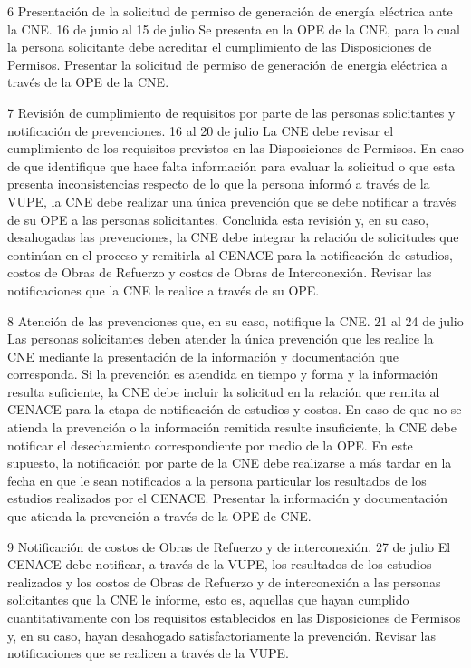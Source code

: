  6
 Presentación de la solicitud de permiso de generación de energía eléctrica ante la CNE.
 16 de junio al 15 de julio
 Se presenta en la OPE de la CNE, para lo cual la persona solicitante debe acreditar el cumplimiento de las Disposiciones de Permisos.
 Presentar la solicitud de permiso de generación de energía eléctrica a través de la OPE de la CNE.
 
 7
 Revisión de cumplimiento de requisitos por parte de las personas solicitantes y notificación de prevenciones.
 16 al 20 de julio
 La CNE debe revisar el cumplimiento de los requisitos previstos en las Disposiciones de Permisos. En caso de que identifique que hace falta información para evaluar la solicitud o que esta presenta inconsistencias respecto de lo que la persona informó a través de la VUPE, la CNE debe realizar una única prevención que se debe notificar a través de su OPE a las personas solicitantes. Concluida esta revisión y, en su caso, desahogadas las prevenciones, la CNE debe integrar la relación de solicitudes que continúan en el proceso y remitirla al CENACE para la notificación de estudios, costos de Obras de Refuerzo y costos de Obras de Interconexión.
 Revisar las notificaciones que la CNE le realice a través de su OPE.
 
 8
 Atención de las prevenciones que, en su caso, notifique la CNE.
 21 al 24 de julio
 Las personas solicitantes deben atender la única prevención que les realice la CNE mediante la presentación de la información y documentación que corresponda. Si la prevención es atendida en tiempo y forma y la información resulta suficiente, la CNE debe incluir la solicitud en la relación que remita al CENACE para la etapa de notificación de estudios y costos. En caso de que no se atienda la prevención o la información remitida resulte insuficiente, la CNE debe notificar el desechamiento correspondiente por medio de la OPE. En este supuesto, la notificación por parte de la CNE debe realizarse a más tardar en la fecha en que le sean notificados a la persona particular los resultados de los estudios realizados por el CENACE.
 Presentar la información y documentación que atienda la prevención a través de la OPE de CNE.
 
 9
 Notificación de costos de Obras de Refuerzo y de interconexión.
 27 de julio
 El CENACE debe notificar, a través de la VUPE, los resultados de los estudios realizados y los costos de Obras de Refuerzo y de interconexión a las personas solicitantes que la CNE le informe, esto es, aquellas que hayan cumplido cuantitativamente con los requisitos establecidos en las Disposiciones de Permisos y, en su caso, hayan desahogado satisfactoriamente la prevención.
 Revisar las notificaciones que se realicen a través de la VUPE.
 
